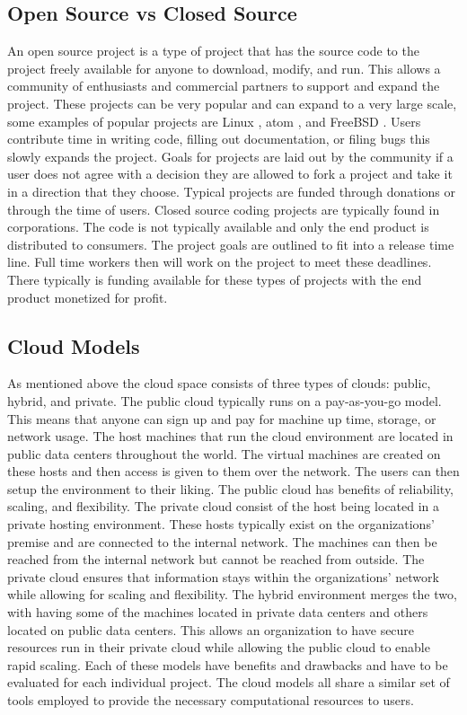 \documentclass[12pt]{article}
\begin{document}
\subsection{Open Source vs Closed Source}
An open source project is a type of project that has the source code to the project freely available for anyone to download, modify, and run. This allows a community of enthusiasts and commercial partners to support and expand the project. These projects can be very popular and can expand to a very large scale, some examples of popular projects are Linux \cite{Linux}, atom \cite{atom}, and FreeBSD \cite{freebsd}. Users contribute time in writing code, filling out documentation, or filing bugs this slowly expands the project. Goals for projects are laid out by the community if a user does not agree with a decision they are allowed to fork a project and take it in a direction that they choose.  Typical projects are funded through donations or through the time of users.  Closed source coding projects are typically found in corporations. The code is not typically available and only the end product is distributed to consumers. The project goals are outlined to fit into a release time line. Full time workers then will work on the project to meet these deadlines. There typically is funding available for these types of projects with the end product monetized for profit.

\subsection{Cloud Models}
As mentioned above the cloud space consists of three types of clouds: public, hybrid, and private. The public cloud typically runs on a pay-as-you-go model. This means that anyone can sign up and pay for machine up time, storage, or network usage. The host machines that run the cloud environment are located in public data centers throughout the world. The virtual machines are created on these hosts and then access is given to them over the network. The users can then setup the environment to their liking. The public cloud has benefits of reliability, scaling, and flexibility. The private cloud consist of the host being located in a private hosting environment.  These hosts typically exist on the organizations' premise and are connected to the internal network. The machines can then be reached from the internal network but cannot be reached from outside. The private cloud ensures that information stays within the organizations' network while allowing for scaling and flexibility. The hybrid environment merges the two, with having some of the machines located in private data centers and others located on public data centers. This allows an organization to have secure resources run in their private cloud while allowing the public cloud to enable rapid scaling.  Each of these models have benefits and drawbacks and have to be evaluated for each individual project. The cloud models all share a similar set of tools employed to provide the necessary computational resources to users.
\end{document}
